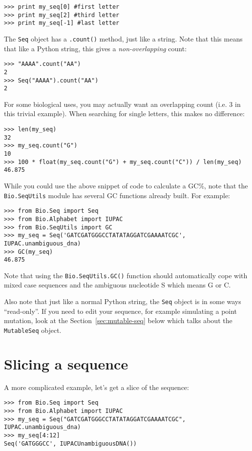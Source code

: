 \documentclass{report}
\begin{document}
\begin{verbatim}
>>> print my_seq[0] #first letter
>>> print my_seq[2] #third letter
>>> print my_seq[-1] #last letter
\end{verbatim}

The \verb|Seq| object has a \verb|.count()| method, just like a string.
Note that this means that like a Python string, this gives a
\emph{non-overlapping} count:

\begin{verbatim}
>>> "AAAA".count("AA")
2
>>> Seq("AAAA").count("AA")
2
\end{verbatim}

\noindent For some biological uses, you may actually want an overlapping count
(i.e. $3$ in this trivial example). When searching for single letters, this
makes no difference:

\begin{verbatim}
>>> len(my_seq)
32
>>> my_seq.count("G")
10
>>> 100 * float(my_seq.count("G") + my_seq.count("C")) / len(my_seq)
46.875
\end{verbatim}

While you could use the above snippet of code to calculate a GC\%, note that  the \verb|Bio.SeqUtils| module has several GC functions already built.  For example:

\begin{verbatim}
>>> from Bio.Seq import Seq
>>> from Bio.Alphabet import IUPAC
>>> from Bio.SeqUtils import GC
>>> my_seq = Seq('GATCGATGGGCCTATATAGGATCGAAAATCGC', IUPAC.unambiguous_dna)
>>> GC(my_seq)
46.875
\end{verbatim}

\noindent Note that using the \verb|Bio.SeqUtils.GC()| function should automatically cope with mixed case sequences and the ambiguous nucleotide S which means G or C.

Also note that just like a normal Python string, the \verb|Seq| object is in some ways ``read-only''.  If you need to edit your sequence, for example simulating a point mutation, look at the Section~\ref{sec:mutable-seq} below which talks about the \verb|MutableSeq| object.

\section{Slicing a sequence}

A more complicated example, let's get a slice of the sequence:

\begin{verbatim}
>>> from Bio.Seq import Seq
>>> from Bio.Alphabet import IUPAC
>>> my_seq = Seq("GATCGATGGGCCTATATAGGATCGAAAATCGC", IUPAC.unambiguous_dna)
>>> my_seq[4:12]
Seq('GATGGGCC', IUPACUnambiguousDNA())
\end{verbatim}
\end{document}
